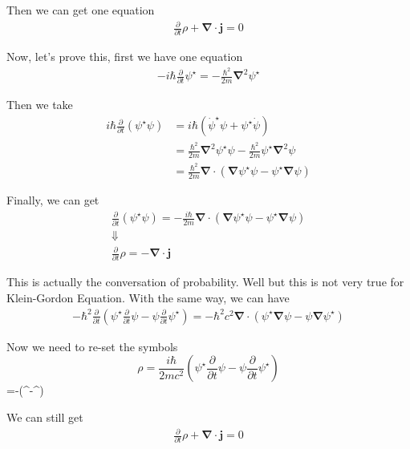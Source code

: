 Then we can get one equation 
\begin{align*}
	\boxed{\frac{\partial}{\partial t}\rho+\pmb{\nabla\cdot j}=0}
\end{align*}

Now, let's prove this, first we have one equation
\begin{align*}
	-i\hbar \frac{\partial}{\partial t}\psi^\star=-\frac{\hbar^2}{2m}\pmb{\nabla}^2\psi^\star
\end{align*}

Then we take 
\begin{align*}
	i\hbar \frac{\partial}{\partial t}(\psi^\star \psi)&=i\hbar (\dot{\psi}^\star\psi+\psi^\star \dot{\psi})\\
	&=\frac{\hbar^2}{2m}\pmb{\nabla}^2 \psi^\star \psi-\frac{\hbar^2}{2m}\psi^\star \pmb{\nabla}^2\psi\\
	&=\frac{\hbar^2}{2m}\pmb{\nabla}\cdot(\pmb{\nabla}\psi^\star \psi-\psi^\star \pmb{\nabla}\psi)
\end{align*}

Finally, we can get 
\begin{gather*}
	\frac{\partial}{\partial t}(\psi^\star \psi)=-\frac{i \hbar}{2m}\pmb{\nabla}\cdot (\pmb{\nabla}\psi^\star \psi-\psi^\star \pmb{\nabla}\psi)\\
	\Downarrow\\
	\frac{\partial}{\partial t}\rho=-\pmb{\nabla}\cdot \pmb{j}
\end{gather*}

This is actually the conversation of probability. Well but this is not very true for Klein-Gordon Equation. With the same way, we can have 
\begin{align*}
	-\hbar^2 \frac{\partial}{\partial t}(\psi^\star \frac{\partial}{\partial t}\psi-\psi \frac{\partial}{\partial t}\psi^\star)=-\hbar^2 c^2 \pmb{\nabla}\cdot(\psi^\star \pmb{\nabla}\psi-\psi \pmb{\nabla}\psi^\star)
\end{align*}

Now we need to re-set the symbols
$$\rho=\frac{i\hbar}{2mc^2} (\psi^\star \frac{\partial}{\partial t}\psi-\psi \frac{\partial}{\partial t}\psi^\star)$$
$$=-(\psi^\star \pmb{\nabla}\psi-\psi \pmb{\nabla}\psi^\star)

We can still get 
\begin{align*}
	\frac{\partial}{\partial	t}\rho+\pmb{\nabla}\cdot \pmb{j}=0
\end{align*}




